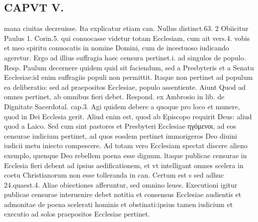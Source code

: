 \documentclass{article}
\begin{document}
\begin{pages}
\section*{CAPVT  V. }
\marginpar{[ p.247 ]}\pstart mana ciuitas decreuisse. Ita explicatur etiam can. Nullus distinct.63. 2 Obiicitur Paulus 1. Corin.5. qui conuocasse videtur totam Ecclesiam, cum ait vers.4. vobis et meo spiritu conuocatis in nomine Domini, cum de incestuoso iudicando ageretur. Ergo ad illius suffragia haec censura pertinet.i. ad singulos de populo. Resp. Paulum decernere quidem quid sit faciendum, sed a Presbyteris et a Senatu Ecclesiae:id enim suffragiis populi non permittit. Itaque non pertinet ad populum ea deliberatio: sed ad praepositos Ecclesiae, populo assentiente. Aiunt Quod ad omnes pertinet, ab omnibus fieri debet. Respond. ex Ambrosio in lib.  de Dignitate Sacerdotal. cap.3. Agi quidem debere a quoque pro loco et munere, quod in Dei Ecclesia gerit. Aliud enim est, quod ab Episcopo requirit Deus: aliud quod a Laico. Sed cum sint pastores et Presbyteri Ecclesiae ηγόμενοι, ad eos censurae iudicium pertinet, ad quos eosdem pertinet immorigeros Deo diuini iudicii metu iniecto compescere. Ad totam vero Ecclesiam spectat discere alieno exemplo, quenque Deo rebellem poena esse dignum. ltaque publicae censurae in Ecclesia fieri debent ad ipsius aedificationem, et vt intelligant omnes scelera in coetu Christianorum non esse tolleranda in can. Certum est s sed adhuc 24.quaest.4. Aliae obiectiones afferuntur, sed omnino leues. Executioni igitur publicae censurae interuenire debet notitia et consensus Ecclesiae audientis et admonitae de poena scelerati hominis et obstinati:ipsius tamen iudicium et executio ad solos praepositos Ecclesiae pertinet.  \pend

\end{pages}
\end{document}
